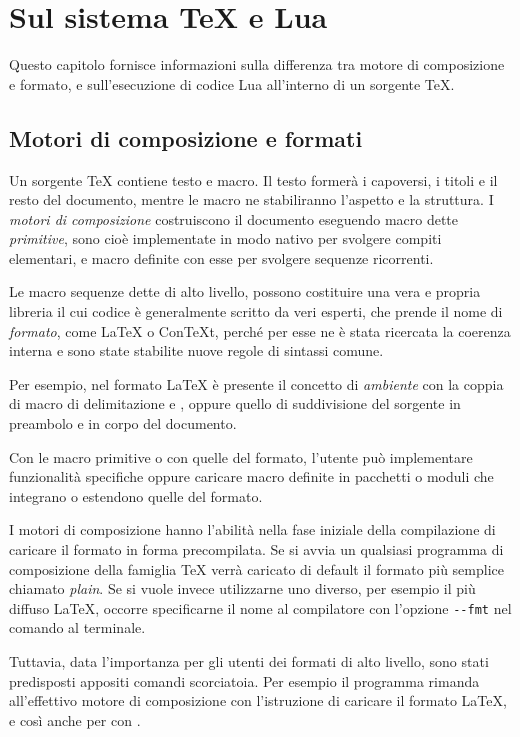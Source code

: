 

\chapter{Sul sistema \TeX{} e Lua}
\label{iChExplain}

Questo capitolo fornisce informazioni sulla differenza tra motore di
composizione e formato, e sull'esecuzione di codice Lua all'interno di un
sorgente \TeX.


\section{Motori di composizione e formati}

Un sorgente \TeX{} contiene testo e macro. Il testo formerà i capoversi, i
titoli e il resto del documento, mentre le macro ne stabiliranno l'aspetto e la
struttura. I \emph{motori di composizione} costruiscono il documento eseguendo
macro dette \emph{primitive}, sono cioè implementate in modo nativo per svolgere
compiti elementari, e macro definite con esse per svolgere sequenze ricorrenti.

Le macro sequenze dette di alto livello, possono costituire una vera e propria
libreria il cui codice è generalmente scritto da veri esperti, che prende il
nome di \emph{formato}, come \LaTeX{} o Con\TeX t, perché per esse ne è stata
ricercata la coerenza interna e sono state stabilite nuove regole di sintassi
comune.

Per esempio, nel formato \LaTeX{} è presente il concetto di \emph{ambiente} con
la coppia di macro di delimitazione  e , oppure quello
di suddivisione del sorgente in preambolo e in corpo del documento.

Con le macro primitive o con quelle del formato, l'utente può implementare
funzionalità specifiche oppure caricare macro definite in pacchetti o moduli che
integrano o estendono quelle del formato.

I motori di composizione hanno l'abilità nella fase iniziale della compilazione
di caricare il formato in forma precompilata. Se si avvia un qualsiasi programma
di composizione della famiglia \TeX{} verrà caricato di default il formato più
semplice chiamato \emph{plain}. Se si vuole invece utilizzarne uno diverso, per
esempio il più diffuso \LaTeX{}, occorre specificarne il nome al compilatore con
l'opzione \texttt{-{}-fmt} nel comando al terminale.

Tuttavia, data l'importanza per gli utenti dei formati di alto livello, sono
stati predisposti appositi comandi scorciatoia. Per esempio il programma
 rimanda all'effettivo motore di composizione  con
l'istruzione di caricare il formato \LaTeX{}, e così anche per 
con .

